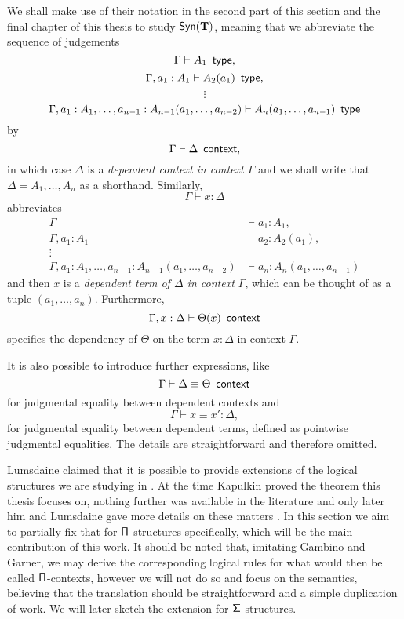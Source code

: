\begin{notation}
  We shall make use of their notation \cite[4]{GG08} in the second part of this
  section and the final chapter of this thesis to study $\mathsf{Syn}(\mathbf{\operatorname{\mathbf{T}}})$, meaning that
  we abbreviate the sequence of judgements
  \[\Gamma\vdash A_1\operatorname{\ \mathsf{type}},\]
  \[\Gamma,a_1:A_1\vdash A_2(a_1)\operatorname{\ \mathsf{type}},\]
  \[\vdots\]
  \[\Gamma,a_1:A_1,\ldots,a_{n-1}:A_{n-1}(a_1,\ldots,a_{n-2})\vdash
  A_n(a_1,\ldots,a_{n-1})\operatorname{\ \mathsf{type}}\]
  by
  \[\Gamma\vdash\Delta\operatorname{\ \mathsf{context}},\]
  in which case $\Delta$ is a \emph{dependent context in context $\Gamma$} and
  we shall write that $\Delta=A_1,\ldots,A_n$ as a shorthand.
  Similarly,
  \[\Gamma\vdash x:\Delta\]
  abbreviates
  \begin{align*}
    \Gamma &\vdash a_1:A_1, \\
    \Gamma,a_1:A_1 &\vdash a_2:A_2(a_1), \\
    \vdots & \\
    \Gamma,a_1:A_1,\ldots,a_{n-1}:A_{n-1}(a_1,\ldots,a_{n-2})
           &\vdash a_n:A_n(a_1,\ldots,a_{n-1})
  \end{align*}
  and then $x$ is a \emph{dependent term of $\Delta$ in context $\Gamma$}, which
  can be thought of as a tuple $(a_1,\ldots,a_n)$. Furthermore,
  \[\Gamma,x:\Delta\vdash\Theta(x)\operatorname{\ \mathsf{context}}\]
  specifies the dependency of $\Theta$ on the term $x:\Delta$ in context
  $\Gamma$.

  \noindent
  It is also possible to introduce further expressions, like
  \[\Gamma\vdash \Delta\equiv\Theta\operatorname{\ \mathsf{context}}\]
  for judgmental equality between dependent contexts and
  \[\Gamma\vdash x\equiv x':\Delta,\]
  for judgmental equality between dependent terms, defined as pointwise
  judgmental equalities. The details are straightforward and therefore omitted.
\end{notation}
\noindent

\noindent
Lumsdaine claimed that it is possible to provide extensions of the logical
structures we are studying in \cite[Rem.\ 1.3.1]{Lum10}. At the
time Kapulkin proved the theorem this thesis focuses on,
nothing further was available in the literature and only later him and
Lumsdaine gave more details on these matters \cite{KL18}. In this section we aim
to partially fix that for $\operatorname{\mathsf{\Pi}}$-structures specifically, which will be the main
contribution of this work. It should be noted that, imitating Gambino and
Garner, we may derive the
corresponding logical rules for what would then be called $\operatorname{\mathsf{\Pi}}$-contexts,
however we will not do so and focus on the semantics, believing that the
translation should be straightforward and a simple duplication of work. We will
later sketch the extension for $\operatorname{\mathsf{\Sigma}}$-structures.

